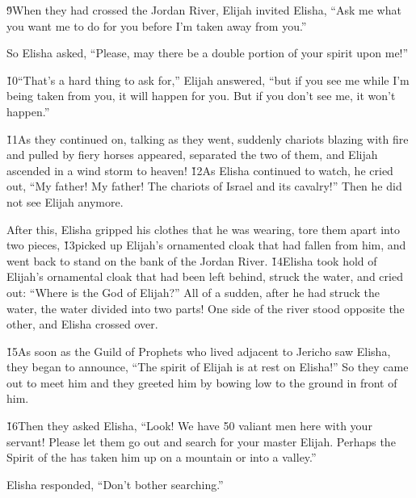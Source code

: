 \v{9}When they had crossed the Jordan River, Elijah invited Elisha, ``Ask me what you want me to do for you before I'm taken away from you.''

So Elisha asked, ``Please, may there be a double portion of your spirit upon me!''

\v{10}``That's a hard thing to ask for,'' Elijah answered, ``but if you see me while I'm being taken from you, it will happen for you. But if you don't see me, it won't happen.''

\v{11}As they continued on, talking as they went, suddenly chariots blazing with fire and pulled by fiery horses appeared, separated the two of them, and Elijah ascended in a wind storm to heaven! \v{12}As Elisha continued to watch, he cried out, ``My father! My father! The chariots of Israel and its cavalry!'' Then he did not see Elijah anymore.

After this, Elisha gripped his clothes that he was wearing, tore them apart into two pieces, \v{13}picked up Elijah's ornamented cloak that had fallen from him, and went back to stand on the bank of the Jordan River. \v{14}Elisha took hold of Elijah's ornamental cloak that had been left behind, struck the water, and cried out: ``Where is the  God of Elijah?'' All of a sudden, after he had struck the water, the water divided into two parts! One side of the river stood opposite the other, and Elisha crossed over.

\v{15}As soon as the Guild of Prophets who lived adjacent to Jericho saw Elisha, they began to announce, ``The spirit of Elijah is at rest on Elisha!'' So they came out to meet him and they greeted him by bowing low to the ground in front of him.

\v{16}Then they asked Elisha, ``Look! We have 50 valiant men here with your servant! Please let them go out and search for your master Elijah. Perhaps the Spirit of the  has taken him up on a mountain or into a valley.''

Elisha responded, ``Don't bother searching.''

